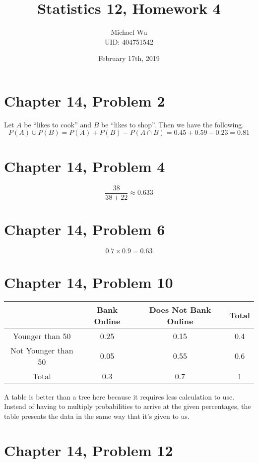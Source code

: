 \documentclass[12pt]{article}
\begin{document}
\title{Statistics 12, Homework 4}
\date{February 17th, 2019}
\author{Michael Wu\\UID: 404751542}
\maketitle

\section*{Chapter 14, Problem 2}

Let \(A\) be ``likes to cook'' and \(B\) be ``likes to shop''. Then we have the following.
\[P(A)\cup P(B) = P(A) + P(B) - P(A\cap B)=0.45 + 0.59 - 0.23=0.81\]

\section*{Chapter 14, Problem 4}

\[\frac{38}{38+22}\approx0.633\]

\section*{Chapter 14, Problem 6}

\[0.7\times0.9=0.63\]

\section*{Chapter 14, Problem 10}

\begin{center}
    \begin{tabular}{c|cc|c}
        & Bank Online & Does Not Bank Online & Total\\
        \hline
        Younger than 50 & 0.25 & 0.15 & 0.4\\
        Not Younger than 50 & 0.05 & 0.55 & 0.6\\
        \hline
        Total & 0.3 & 0.7 & 1
    \end{tabular}
\end{center}
A table is better than a tree here because it requires less calculation to use. Instead of having
to multiply probabilities to arrive at the given percentages, the table presents the data
in the same way that it's given to us.

\section*{Chapter 14, Problem 12}
\end{document}
